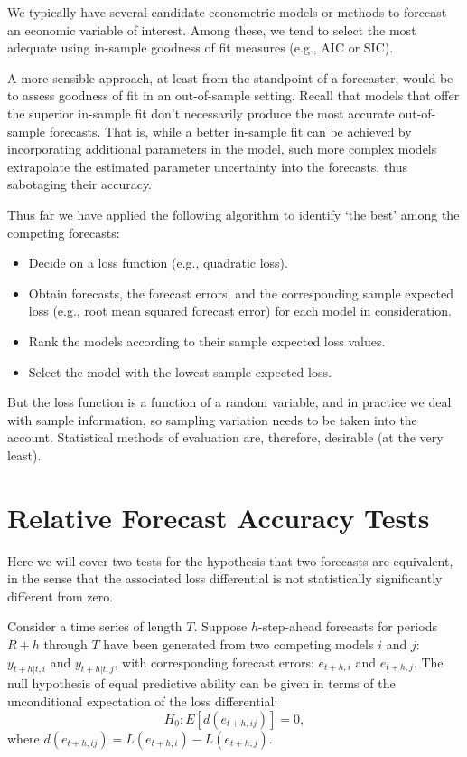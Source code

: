 \documentclass[
  12pt,
  oneside]{book}
\providecommand{\tightlist}{%
  \setlength{\itemsep}{0pt}\setlength{\parskip}{0pt}}
\begin{document}
We typically have several candidate econometric models or methods to forecast an economic variable of interest. Among these, we tend to select the most adequate using in-sample goodness of fit measures (e.g., AIC or SIC).

A more sensible approach, at least from the standpoint of a forecaster, would be to assess goodness of fit in an out-of-sample setting. Recall that models that offer the superior in-sample fit don't necessarily produce the most accurate out-of-sample forecasts. That is, while a better in-sample fit can be achieved by incorporating additional parameters in the model, such more complex models extrapolate the estimated parameter uncertainty into the forecasts, thus sabotaging their accuracy.

Thus far we have applied the following algorithm to identify `the best' among the competing forecasts:

\begin{itemize}
\tightlist
\item
  Decide on a loss function (e.g., quadratic loss).
\item
  Obtain forecasts, the forecast errors, and the corresponding sample expected loss (e.g., root mean squared forecast error) for each model in consideration.
\item
  Rank the models according to their sample expected loss values.
\item
  Select the model with the lowest sample expected loss.
\end{itemize}

But the loss function is a function of a random variable, and in practice we deal with sample information, so sampling variation needs to be taken into the account. Statistical methods of evaluation are, therefore, desirable (at the very least).

\hypertarget{relative-forecast-accuracy-tests}{%
\section{Relative Forecast Accuracy Tests}\label{relative-forecast-accuracy-tests}}

Here we will cover two tests for the hypothesis that two forecasts are equivalent, in the sense that the associated loss differential is not statistically significantly different from zero.

Consider a time series of length \(T\). Suppose \(h\)-step-ahead forecasts for periods \(R+h\) through \(T\) have been generated from two competing models \(i\) and \(j\): \(y_{t+h|t,i}\) and \(y_{t+h|t,j}\), with corresponding forecast errors: \(e_{t+h,i}\) and \(e_{t+h,j}\). The null hypothesis of equal predictive ability can be given in terms of the unconditional expectation of the loss differential: \[H_0: E\left[d(e_{t+h,ij})\right] = 0,\] where \(d(e_{t+h,ij}) = L(e_{t+h,i})-L(e_{t+h,j})\).
\end{document}
